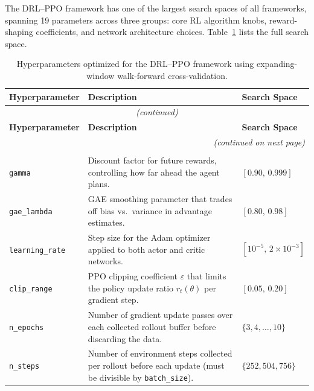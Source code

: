 The DRL--PPO framework has one of the largest search spaces of all frameworks, spanning 19 parameters across three groups: core RL algorithm knobs, reward-shaping coefficients, and network architecture choices. Table~\ref{tab:hp_drl_ppo} lists the full search space.

\begin{longtable}{@{}p{3.7cm} p{7.5cm} p{3.3cm}@{}}
\caption{Hyperparameters optimized for the DRL--PPO framework using expanding-window walk-forward cross-validation.}
\label{tab:hp_drl_ppo} \\
\toprule
\textbf{Hyperparameter} & \textbf{Description} & \textbf{Search Space} \\
\midrule
\endfirsthead

\multicolumn{3}{c}{\footnotesize\textit{(continued)}} \\
\toprule
\textbf{Hyperparameter} & \textbf{Description} & \textbf{Search Space} \\
\midrule
\endhead

\bottomrule
\multicolumn{3}{r}{\footnotesize\textit{(continued on next page)}} \\
\endfoot

\bottomrule
\endlastfoot
 
\multicolumn{3}{@{}l}{\small\textit{--- Core PPO Hyperparameters ---}} \\[2pt]
 
\texttt{gamma} & Discount factor for future rewards, controlling how far ahead the agent plans. & $[0.90,\,0.999]$ \\[4pt]
 
\texttt{gae\_lambda} & GAE smoothing parameter that trades off bias vs.\ variance in advantage estimates. & $[0.80,\,0.98]$ \\[4pt]
 
\texttt{learning\_rate} & Step size for the Adam optimizer applied to both actor and critic networks. & $[10^{-5},\,2\times10^{-3}]$ \\[4pt]
 
\texttt{clip\_range} & PPO clipping coefficient $\varepsilon$ that limits the policy update ratio $r_t(\theta)$ per gradient step. & $[0.05,\,0.20]$ \\[4pt]
 
\texttt{n\_epochs} & Number of gradient update passes over each collected rollout buffer before discarding the data. & $\{3,4,\ldots,10\}$ \\[4pt]
 
\texttt{n\_steps} & Number of environment steps collected per rollout before each update (must be divisible by \texttt{batch\_size}). & $\{252, 504, 756\}$ \\[4pt]
 

\end{longtable}
